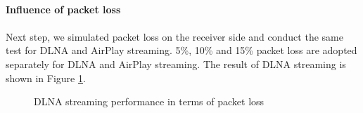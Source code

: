 \\
\textbf{Influence of packet loss}\\
\\
Next step, we simulated packet loss on the receiver side and conduct the same test for DLNA and AirPlay streaming. 5\%, 10\% and 15\% packet loss are adopted separately for DLNA and AirPlay streaming. The result of DLNA streaming is shown in Figure \ref{dlna_pl}. \\
\begin{figure}
\hfill
{}
\hfill
{}
\hfill
{}
\hfill
{}
\hfill
\caption{DLNA streaming performance in terms of packet loss \label{dlna_pl}}
\end{figure}
